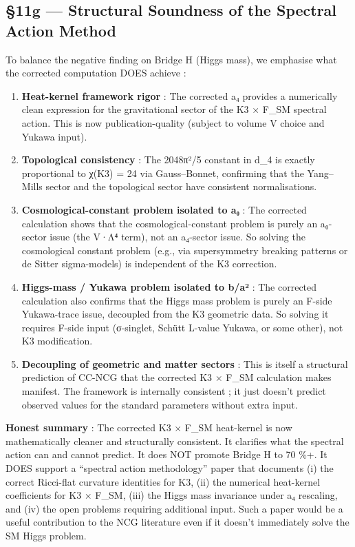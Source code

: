 \documentclass[
  11pt,
  a4paper,
]{article}
\begin{document}
\hypertarget{g-structural-soundness-of-the-spectral-action-method}{%
\subsection{§11g --- Structural Soundness of the Spectral Action Method}\label{g-structural-soundness-of-the-spectral-action-method}}

To balance the negative finding on Bridge H (Higgs mass), we emphasise what the corrected computation DOES achieve :

\begin{enumerate}
\def\labelenumi{\arabic{enumi}.}
\item
  \textbf{Heat-kernel framework rigor} : The corrected a₄ provides a numerically clean expression for the gravitational sector of the K3 × F\_SM spectral action. This is now publication-quality (subject to volume V choice and Yukawa input).
\item
  \textbf{Topological consistency} : The 2048π²/5 constant in d\_4 is exactly proportional to χ(K3) = 24 via Gauss--Bonnet, confirming that the Yang--Mills sector and the topological sector have consistent normalisations.
\item
  \textbf{Cosmological-constant problem isolated to a₀} : The corrected calculation shows that the cosmological-constant problem is purely an a₀-sector issue (the V·Λ⁴ term), not an a₄-sector issue. So solving the cosmological constant problem (e.g., via supersymmetry breaking patterns or de Sitter sigma-models) is independent of the K3 correction.
\item
  \textbf{Higgs-mass / Yukawa problem isolated to b/a²} : The corrected calculation also confirms that the Higgs mass problem is purely an F-side Yukawa-trace issue, decoupled from the K3 geometric data. So solving it requires F-side input (σ-singlet, Schütt L-value Yukawa, or some other), not K3 modification.
\item
  \textbf{Decoupling of geometric and matter sectors} : This is itself a structural prediction of CC-NCG that the corrected K3 × F\_SM calculation makes manifest. The framework is internally consistent ; it just doesn't predict observed values for the standard parameters without extra input.
\end{enumerate}

\textbf{Honest summary} : The corrected K3 × F\_SM heat-kernel is now mathematically cleaner and structurally consistent. It clarifies what the spectral action can and cannot predict. It does NOT promote Bridge H to 70 \%+. It DOES support a ``spectral action methodology'' paper that documents (i) the correct Ricci-flat curvature identities for K3, (ii) the numerical heat-kernel coefficients for K3 × F\_SM, (iii) the Higgs mass invariance under a₄ rescaling, and (iv) the open problems requiring additional input. Such a paper would be a useful contribution to the NCG literature even if it doesn't immediately solve the SM Higgs problem.
\end{document}
